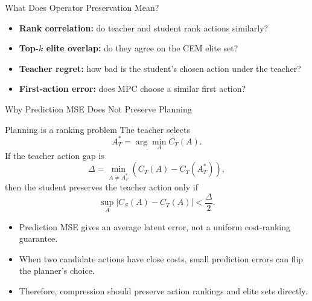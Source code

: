 \documentclass[aspectratio=169,11pt]{beamer}
\begin{document}
\begin{frame}{What Does Operator Preservation Mean?}

    \begin{itemize}
        \item \textbf{Rank correlation:} do teacher and student rank actions similarly?
        \item \textbf{Top-$k$ elite overlap:} do they agree on the CEM elite set?
        \item \textbf{Teacher regret:} how bad is the student's chosen action under the teacher?
        \item \textbf{First-action error:} does MPC choose a similar first action?
    \end{itemize}

\end{frame}

\begin{frame}{Why Prediction MSE Does Not Preserve Planning}
    \begin{block}{Planning is a ranking problem}
        The teacher selects
        \[
            A_T^* = \arg\min_A C_T(A).
        \]
        If the teacher action gap is
        \[
            \Delta =
            \min_{A \neq A_T^*}
            \left(C_T(A) - C_T(A_T^*)\right),
        \]
        then the student preserves the teacher action only if
        \[
            \sup_A |C_S(A)-C_T(A)| < \frac{\Delta}{2}.
        \]
    \end{block}

    \vspace{0.5em}

    \begin{itemize}
        \item Prediction MSE gives an average latent error, not a uniform cost-ranking guarantee.
        \item When two candidate actions have close costs, small prediction errors can flip the planner's choice.
        \item Therefore, compression should preserve action rankings and elite sets directly.
    \end{itemize}
\end{frame}
\end{document}
